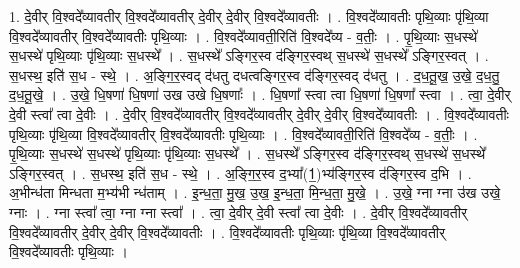 \documentclass[17pt]{extarticle}
\begin{document}
1. दे॒वीर् वि॒श्वदे᳚व्यावतीर् वि॒श्वदे᳚व्यावतीर् दे॒वीर् दे॒वीर् वि॒श्वदे᳚व्यावतीः । . वि॒श्वदे᳚व्यावतीः पृथि॒व्याः पृ॑थि॒व्या वि॒श्वदे᳚व्यावतीर् वि॒श्वदे᳚व्यावतीः पृथि॒व्याः । . वि॒श्वदे᳚व्यावती॒रिति॑ वि॒श्वदे᳚व्य - व॒तीः॒ । . पृ॒थि॒व्याः स॒धस्थे॑ स॒धस्थे॑ पृथि॒व्याः पृ॑थि॒व्याः स॒धस्थे᳚ । . स॒धस्थे᳚ ऽङ्गिर॒स्व द॑ङ्गिर॒स्वथ् स॒धस्थे॑ स॒धस्थे᳚ ऽङ्गिर॒स्वत् । . स॒धस्थ॒ इति॑ स॒ध - स्थे॒ । . अ॒ङ्गि॒र॒स्वद् द॑धतु दधत्वङ्गिर॒स्व द॑ङ्गिर॒स्वद् द॑धतु । . द॒ध॒तू॒ख॒ उ॒खे॒ द॒ध॒तु॒ द॒ध॒तू॒खे॒ । . उ॒खे॒ धि॒षणा॑ धि॒षणा॑ उख उखे धि॒षणाः᳚ । . धि॒षणा᳚ स्त्वा त्वा धि॒षणा॑ धि॒षणा᳚ स्त्वा । . त्वा॒ दे॒वीर् दे॒वी स्त्वा᳚ त्वा दे॒वीः । . दे॒वीर् वि॒श्वदे᳚व्यावतीर् वि॒श्वदे᳚व्यावतीर् दे॒वीर् दे॒वीर् वि॒श्वदे᳚व्यावतीः । . वि॒श्वदे᳚व्यावतीः पृथि॒व्याः पृ॑थि॒व्या वि॒श्वदे᳚व्यावतीर् वि॒श्वदे᳚व्यावतीः पृथि॒व्याः । . वि॒श्वदे᳚व्यावती॒रिति॑ वि॒श्वदे᳚व्य - व॒तीः॒ । . पृ॒थि॒व्याः स॒धस्थे॑ स॒धस्थे॑ पृथि॒व्याः पृ॑थि॒व्याः स॒धस्थे᳚ । . स॒धस्थे᳚ ऽङ्गिर॒स्व द॑ङ्गिर॒स्वथ् स॒धस्थे॑ स॒धस्थे᳚ ऽङ्गिर॒स्वत् । . स॒धस्थ॒ इति॑ स॒ध - स्थे॒ । . अ॒ङ्गि॒र॒स्व द॒भ्या᳚(1॒)भ्य॑ङ्गिर॒स्व द॑ङ्गिर॒स्व द॒भि । . अ॒भीन्ध॑ता मिन्धता म॒भ्य॑भी न्ध॑ताम् । . इ॒न्ध॒ता॒ मु॒ख॒ उ॒ख॒ इ॒न्ध॒ता॒ मि॒न्ध॒ता॒ मु॒खे॒ । . उ॒खे॒ ग्ना ग्ना उ॑ख उखे॒ ग्नाः । . ग्ना स्त्वा᳚ त्वा॒ ग्ना ग्ना स्त्वा᳚ । . त्वा॒ दे॒वीर् दे॒वी स्त्वा᳚ त्वा दे॒वीः । . दे॒वीर् वि॒श्वदे᳚व्यावतीर् वि॒श्वदे᳚व्यावतीर् दे॒वीर् दे॒वीर् वि॒श्वदे᳚व्यावतीः । . वि॒श्वदे᳚व्यावतीः पृथि॒व्याः पृ॑थि॒व्या वि॒श्वदे᳚व्यावतीर् वि॒श्वदे᳚व्यावतीः पृथि॒व्याः । \newline
\end{document}
